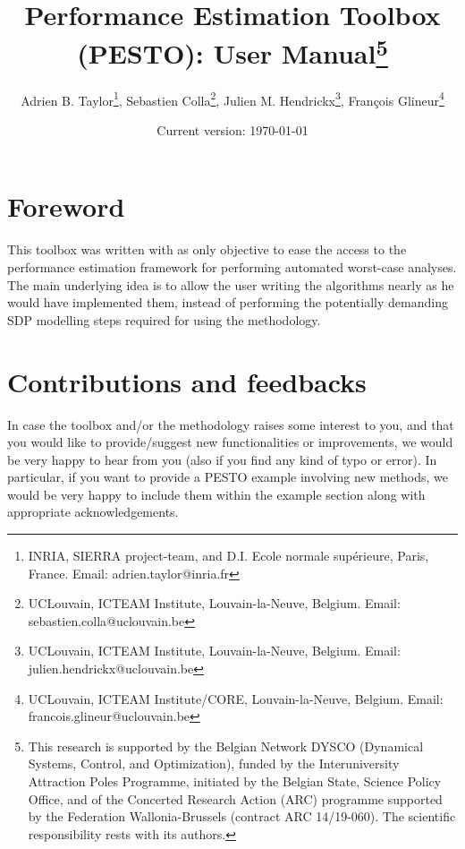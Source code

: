 \documentclass[11pt,a4paper]{article}
\begin{document}
	\author{Adrien B. Taylor\footnote{INRIA, SIERRA project-team, and D.I. Ecole normale sup\'erieure, Paris, France. Email: adrien.taylor@inria.fr}, Sebastien Colla\footnote{UCLouvain, ICTEAM Institute, Louvain-la-Neuve, Belgium. Email: sebastien.colla@uclouvain.be}, Julien M. Hendrickx\footnote{UCLouvain, ICTEAM Institute, Louvain-la-Neuve, Belgium. Email:
			julien.hendrickx@uclouvain.be}, Fran\c{c}ois Glineur\footnote{UCLouvain, ICTEAM Institute/CORE, Louvain-la-Neuve, Belgium. Email: francois.glineur@uclouvain.be}}
	\title{Performance Estimation Toolbox (PESTO): User Manual\thanks{This research is supported by the Belgian Network DYSCO (Dynamical Systems, Control, and Optimization), funded by the Interuniversity Attraction Poles Programme, initiated by the Belgian State, Science Policy Office, and of the Concerted Research Action (ARC) programme supported by the Federation Wallonia-Brussels (contract ARC 14/19-060). The scientific responsibility rests with its authors.}}
	\date{Current version: \today}
	\maketitle

	\renewcommand*\contentsname{}
	\setcounter{tocdepth}{2} \tableofcontents
	
	\clearpage
	\section*{Foreword}
	This toolbox was written with as only objective to ease the access to the performance estimation framework for performing automated worst-case analyses. The main underlying idea is to allow the user writing the algorithms nearly as he would have implemented them, instead of performing the potentially demanding SDP modelling steps required for using the methodology.

	\section*{Contributions and feedbacks}
	In case the toolbox and/or the methodology raises some interest to you, and that you would like to provide/suggest new functionalities or improvements, we would be very happy to hear from you (also if you find any kind of typo or error). In particular, if you want to provide a PESTO example involving new methods, we would be very happy to include them within the example section along with appropriate acknowledgements.
\end{document}
